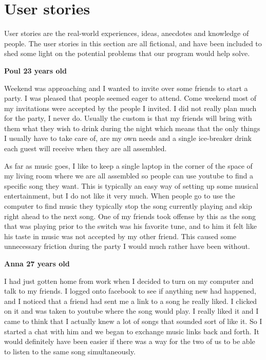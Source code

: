 \section{User stories}

User stories are the real-world experiences, ideas, anecdotes and knowledge of people\cite{Benyon10}. The user stories in this section are all fictional, and have been included to shed some light on the potential problems that our program would help solve.

\vspace{5 mm}
\textbf{Poul 23 years old}

\vspace{5 mm}
\noindent
Weekend was approaching and I wanted to invite over some friends to start a party. I was pleased that people seemed eager to attend. Come weekend most of my invitations were accepted by the people I invited. I did not really plan much for the party, I never do. Usually the custom is that my friends will bring with them what they wish to drink during the night which means that the only things I usually have to take care of, are my own needs and a single ice-breaker drink each guest will receive when they are all assembled.  

As far as music goes, I like to keep a single laptop in the corner of the space of my living room where we are all assembled so people can use youtube to find a specific song they want. This is typically an easy way of setting up some musical entertainment, but I do not like it very much. When people go to use the computer to find music they typically stop the song currently playing and skip right ahead to the next song. One of my friends took offense by this as the song that was playing prior to the switch was his favorite tune, and to him it felt like his taste in music was not accepted by my other friend. This caused some unnecessary friction during the party I would much rather have been without.

\vspace{5 mm}
\noindent
\textbf{Anna 27 years old}

\vspace{5 mm}
\noindent
I had just gotten home from work when I decided to turn on my computer and talk to my friends. I logged onto facebook to see if anything new had happened, and I noticed that a friend had sent me a link to a song he really liked. I clicked on it and was taken to youtube where the song would play. I really liked it and I came to think that I actually knew a lot of songs that sounded sort of like it. So I started a chat with him and we began to exchange music links back and forth. It would definitely have been easier if there was a way for the two of us to be able to listen to the same song simultaneously. 

